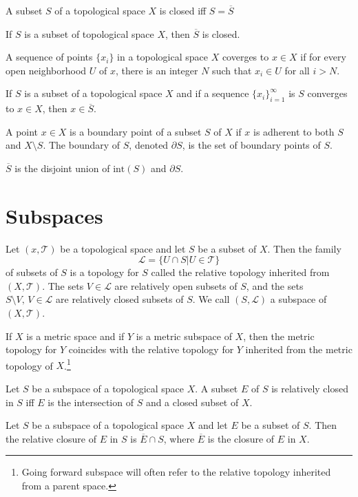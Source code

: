 \documentclass[nobib,notoc]{tufte-handout}
\begin{document}
\begin{thm}
	A subset \(S\) of a topological space \(X\) is closed iff \(S=\overline{S}\)
\end{thm}
\begin{thm}
	If \(S\) is a subset of topological space \(X\), then \(\overline{S}\) is closed.
\end{thm}
\begin{defi}[Convergence]
	A sequence of points \(\{x_i\}\) in a topological space \(X\) coverges to \(x\in X\) if for every open neighborhood \(U\) of \(x\), there is an integer \(N\) such that \(x_i\in U\) for all \(i>N\).
\end{defi}
\begin{thm}
	If \(S\) is a subset of a topological space \(X\) and if a sequence \(\{x_i\}_{i=1}^{\infty}\) is \(S\) converges to \(x\in X\), then \(x\in\overline{S}\).
\end{thm}
\begin{defi}
	A point \(x\in X\) is a boundary point of a subset \(S\) of \(X\) if \(x\) is adherent to both \(S\) and \(X\setminus S\). The boundary of \(S\), denoted \(\partial S\), is the set of boundary points of \(S\).
\end{defi}
\begin{thm}
	\(\overline{S}\) is the disjoint union of \(\text{int}(S)\) and \(\partial S\).
\end{thm}
\section{Subspaces}
\begin{defi}
	Let \((x,\mathscr{T})\) be a topological space and let \(S\) be a subset of \(X\). Then the family
	\begin{equation*}
		\mathscr{L}=\{U\cap S|U\in\mathscr{T}\}
	\end{equation*}
	of subsets of \(S\) is a topology for \(S\) called the relative topology inherited from \((X,\mathscr{T})\). The sets \(V\in\mathscr{L}\) are relatively open subsets of \(S\), and the sets \(S\setminus V,\,V\in\mathscr{L}\) are relatively closed subsets of \(S\). We call \((S,\mathscr{L})\) a subspace of \((X,\mathscr{T})\).
\end{defi}
\begin{rema}
	If \(X\) is a metric space and if \(Y\) is a metric subspace of \(X\), then the metric topology for \(Y\) coincides with the relative topology for \(Y\) inherited from the metric topology of \(X\).\footnote{Going forward subspace will often refer to the relative topology inherited from a parent space.}
\end{rema}
\begin{thm}
Let \(S\) be a subspace of a topological space \(X\). A subset \(E\) of \(S\) is relatively closed in \(S\) iff \(E\) is the intersection of \(S\) and a closed subset of \(X\).
\end{thm}
\begin{thm}
	Let \(S\) be a subspace of a topological space \(X\) and let \(E\) be a subset of \(S\). Then the relative closure of \(E\) in \(S\) is \(\overline{E}\cap S\), where \(\overline{E}\) is the closure of \(E\) in \(X\).
\end{thm}
\end{document}
